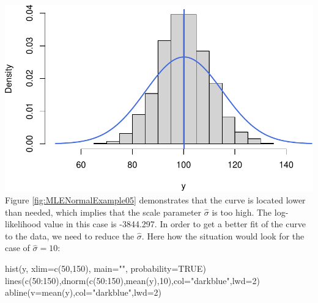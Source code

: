 \documentclass[
]{book}
\newenvironment{Shaded}{\begin{snugshade}}{\end{snugshade}}
\newcommand{\AttributeTok}[1]{\textcolor[rgb]{0.77,0.63,0.00}{#1}}
\newcommand{\ConstantTok}[1]{\textcolor[rgb]{0.00,0.00,0.00}{#1}}
\newcommand{\DecValTok}[1]{\textcolor[rgb]{0.00,0.00,0.81}{#1}}
\newcommand{\FunctionTok}[1]{\textcolor[rgb]{0.00,0.00,0.00}{#1}}
\newcommand{\NormalTok}[1]{#1}
\newcommand{\SpecialCharTok}[1]{\textcolor[rgb]{0.00,0.00,0.00}{#1}}
\newcommand{\StringTok}[1]{\textcolor[rgb]{0.31,0.60,0.02}{#1}}
\theoremstyle{definition}
\theoremstyle{definition}
\theoremstyle{definition}
\theoremstyle{definition}
\theoremstyle{remark}
\begin{document}
\includegraphics{Svetunkov---Statistics-for-Business-Analytics_files/figure-latex/MLENormalExample05-1.pdf}
Figure \ref{fig:MLENormalExample05} demonstrates that the curve is located lower than needed, which implies that the scale parameter \(\hat{\sigma}\) is too high. The log-likelihood value in this case is -3844.297. In order to get a better fit of the curve to the data, we need to reduce the \(\hat{\sigma}\). Here how the situation would look for the case of \(\hat{\sigma}=10\):

\begin{Shaded}
\begin{Highlighting}[]
\FunctionTok{hist}\NormalTok{(y, }\AttributeTok{xlim=}\FunctionTok{c}\NormalTok{(}\DecValTok{50}\NormalTok{,}\DecValTok{150}\NormalTok{), }\AttributeTok{main=}\StringTok{""}\NormalTok{, }\AttributeTok{probability=}\ConstantTok{TRUE}\NormalTok{)}
\FunctionTok{lines}\NormalTok{(}\FunctionTok{c}\NormalTok{(}\DecValTok{50}\SpecialCharTok{:}\DecValTok{150}\NormalTok{),}\FunctionTok{dnorm}\NormalTok{(}\FunctionTok{c}\NormalTok{(}\DecValTok{50}\SpecialCharTok{:}\DecValTok{150}\NormalTok{),}\FunctionTok{mean}\NormalTok{(y),}\DecValTok{10}\NormalTok{),}\AttributeTok{col=}\StringTok{"darkblue"}\NormalTok{,}\AttributeTok{lwd=}\DecValTok{2}\NormalTok{)}
\FunctionTok{abline}\NormalTok{(}\AttributeTok{v=}\FunctionTok{mean}\NormalTok{(y),}\AttributeTok{col=}\StringTok{"darkblue"}\NormalTok{,}\AttributeTok{lwd=}\DecValTok{2}\NormalTok{)}
\end{Highlighting}
\end{Shaded}
\end{document}
